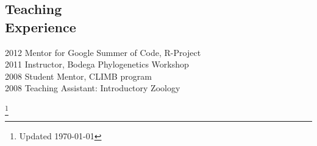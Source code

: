 \documentclass[margin]{res}
\begin{document}
\begin{resume}
\section{Teaching\\Experience}
2012 Mentor for Google Summer of Code, R-Project \\
2011 Instructor, Bodega Phylogenetics Workshop \\
2008 Student Mentor, CLIMB program \\
2008 Teaching Assistant: Introductory Zoology

\end{resume}
\let\thefootnote\relax\footnote{Updated \today}
\end{document}

